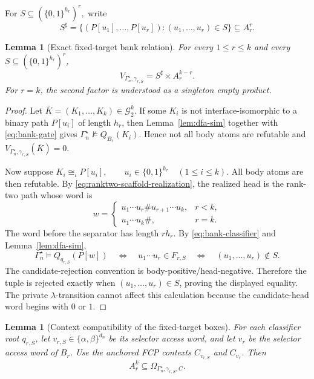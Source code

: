 \documentclass[11pt]{article}
\newtheorem{lemma}[theorem]{Lemma}
\theoremstyle{definition}
\theoremstyle{remark}
\newcommand{\Gtwo}{\mathcal G_2}
\begin{document}
For
\(S\subseteq(\{0,1\}^{h_r})^r,\)
write
\[
S^\sharp
=
\{(P[u_1],\ldots,P[u_r]):
(u_1,\ldots,u_r)\in S\}
\subseteq A_r^r.
\]

\begin{lemma}[Exact fixed-target bank relation]
\label{lem:fixed-target-bank-relation}
For every \(1\le r\le k\) and every
\(S\subseteq(\{0,1\}^{h_r})^r\),
\[
\boxed{
V_{\Gamma_n^\star,\gamma_{r,S}}
=
S^\sharp\times A_r^{k-r}.
}
\]
For \(r=k\), the second factor is understood as a singleton empty product.
\end{lemma}

\begin{proof}
Let \(\bar K=(K_1,\ldots,K_k)\in\Gtwo^k\).
If some \(K_i\) is not interface-isomorphic to a binary path
\(P[u_i]\) of length \(h_r\), then Lemma~\ref{lem:dfa-sim} together with
\eqref{eq:bank-gate} gives
\(\Gamma_n^\star\not\models Q_{B_r}(K_i).\)
Hence not all body atoms are refutable and
\(V_{\Gamma_n^\star,\gamma_{r,S}}(\bar K)=0\).

Now suppose
\(K_i\cong_\iota P[u_i], \qquad u_i\in\{0,1\}^{h_r} \quad(1\le i\le k).\)
All body atoms are then refutable.  By
\eqref{eq:ranktwo-scaffold-realization}, the realized head is the rank-two
path whose word is
\[
w=
\begin{cases}
u_1\cdots u_r\#u_{r+1}\cdots u_k,&r<k,\\
u_1\cdots u_k\#,&r=k.
\end{cases}
\]
The word before the separator has length \(rh_r\).  By
\eqref{eq:bank-classifier} and Lemma~\ref{lem:dfa-sim},
\[
\Gamma_n^\star\models Q_{q_{r,S}}(P[w])
\quad\Longleftrightarrow\quad
u_1\cdots u_r\in F_{r,S}
\quad\Longleftrightarrow\quad
(u_1,\ldots,u_r)\notin S.
\]
The candidate-rejection convention is body-positive/head-negative.
Therefore the tuple is rejected exactly when
\((u_1,\ldots,u_r)\in S\), proving the displayed equality.
The private \(\lambda\)-transition cannot affect this calculation because
the candidate-head word begins with \(0\) or \(1\).
\end{proof}

\begin{lemma}[Context compatibility of the fixed-target boxes]
\label{lem:fixed-target-bank-compatible}
For each classifier root \(q_{r,S}\), let \(v_{r,S}\in\{\alpha,\beta\}^{d_n}\)
be its selector access word, and let \(v_r\) be the selector access word of
\(B_r\).  Use the anchored FCP contexts \(C_{v_{r,S}}\) and \(C_{v_r}\).
Then
\[
A_r^k
\subseteq
\Omega_{\Gamma_n^\star,\gamma_{r,S},C}.
\]
\end{lemma}
\end{document}
